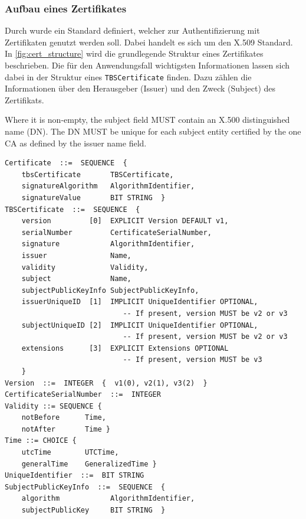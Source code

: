 \subsubsection*{Aufbau eines Zertifikates}

Durch \citeauthor{RFC3280} wurde ein Standard definiert, welcher zur Authentifizierung mit Zertifikaten genutzt werden soll. Dabei handelt es sich um den X.509 Standard. In \vref{fig:cert_structure} wird die grundlegende Struktur eines Zertifikates beschrieben. Die für den Anwendungsfall wichtigsten Informationen lassen sich dabei in der Struktur eines \texttt{TBSCertificate} finden. Dazu zählen die Informationen über den Herausgeber (Issuer) und den Zweck (Subject) des Zertifikats. \autocite{RFC3280}

\begin{definition}[Subject]
    Where it is non-empty, the subject field MUST contain an X.500 distinguished name (DN).  The DN MUST be unique for each subject entity certified by the one CA as defined by the issuer name field. \autocite[Kapitel~4.1.2.6]{RFC3280}
\end{definition}

\begin{verbatim}
Certificate  ::=  SEQUENCE  {
    tbsCertificate       TBSCertificate,
    signatureAlgorithm   AlgorithmIdentifier,
    signatureValue       BIT STRING  }
TBSCertificate  ::=  SEQUENCE  {
    version         [0]  EXPLICIT Version DEFAULT v1,
    serialNumber         CertificateSerialNumber,
    signature            AlgorithmIdentifier,
    issuer               Name,
    validity             Validity,
    subject              Name,
    subjectPublicKeyInfo SubjectPublicKeyInfo,
    issuerUniqueID  [1]  IMPLICIT UniqueIdentifier OPTIONAL,
                            -- If present, version MUST be v2 or v3
    subjectUniqueID [2]  IMPLICIT UniqueIdentifier OPTIONAL,
                            -- If present, version MUST be v2 or v3
    extensions      [3]  EXPLICIT Extensions OPTIONAL
                            -- If present, version MUST be v3
    }
Version  ::=  INTEGER  {  v1(0), v2(1), v3(2)  }
CertificateSerialNumber  ::=  INTEGER
Validity ::= SEQUENCE {
    notBefore      Time,
    notAfter       Time }
Time ::= CHOICE {
    utcTime        UTCTime,
    generalTime    GeneralizedTime }
UniqueIdentifier  ::=  BIT STRING
SubjectPublicKeyInfo  ::=  SEQUENCE  {
    algorithm            AlgorithmIdentifier,
    subjectPublicKey     BIT STRING  }
\end{verbatim}
\label{fig:cert_structure}
\begin{center}
    \small {}
\end{center}

